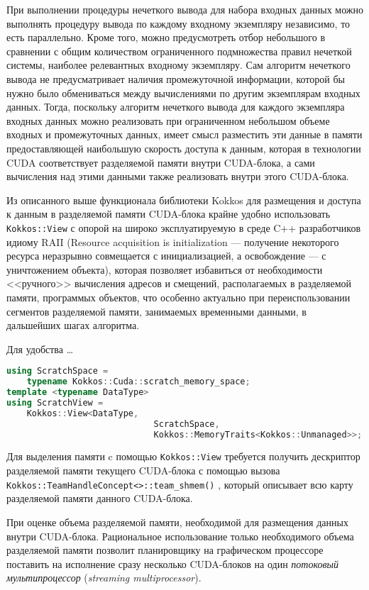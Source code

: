 При выполнении процедуры нечеткого вывода для набора входных данных можно выполнять процедуру вывода по каждому входному экземпляру независимо, то есть параллельно. Кроме того, можно предусмотреть отбор небольшого в сравнении с общим количеством ограниченного подмножества правил нечеткой системы, наиболее релевантных входному экземпляру. Сам алгоритм нечеткого вывода не предусматривает наличия промежуточной информации, которой бы нужно было обмениваться между вычислениями по другим экземплярам входных данных. Тогда, поскольку алгоритм нечеткого вывода для каждого экземпляра входных данных можно реализовать при ограниченном небольшом объеме входных и промежуточных данных, имеет смысл разместить эти данные в памяти предоставляющей наибольшую скорость доступа к данным, которая в технологии CUDA соответствует разделяемой памяти внутри CUDA-блока, а сами вычисления над этими данными также реализовать внутри этого CUDA-блока.

Из описанного выше функционала библиотеки Kokkos для размещения и доступа к данным в разделяемой памяти CUDA-блока крайне удобно использовать \lstinline{Kokkos::View} с опорой на широко эксплуатируемую в среде C++ разработчиков идиому RAII (Resource acquisition is initialization --- получение некоторого ресурса неразрывно совмещается с инициализацией, а освобождение --- с уничтожением объекта), которая позволяет избавиться от необходимости <<ручного>> вычисления адресов и смещений, располагаемых в разделяемой памяти, программых объектов, что особенно актуально при переиспользовании сегментов разделяемой памяти, занимаемых временными данными, в дальшейших шагах алгоритма.

Для удобства \dots

\begin{lstlisting}[language=C++]
using ScratchSpace =
	typename Kokkos::Cuda::scratch_memory_space;
template <typename DataType>
using ScratchView =
	Kokkos::View<DataType,
							 ScratchSpace,
							 Kokkos::MemoryTraits<Kokkos::Unmanaged>>;
\end{lstlisting}

Для выделения памяти c помощью \lstinline{Kokkos::View} требуется получить дескриптор разделяемой памяти текущего CUDA-блока с помощью вызова \lstinline{Kokkos::TeamHandleConcept<>::team_shmem()} , который описывает всю карту разделяемой памяти данного CUDA-блока. 

При оценке объема разделяемой памяти, необходимой для размещения данных внутри CUDA-блока. Рациональное использование только необходимого объема разделяемой памяти позволит планировщику на графическом процессоре поставить на исполнение сразу несколько CUDA-блоков на один \textit{потоковый мультипроцессор} (\textit{streaming multiprocessor}).

